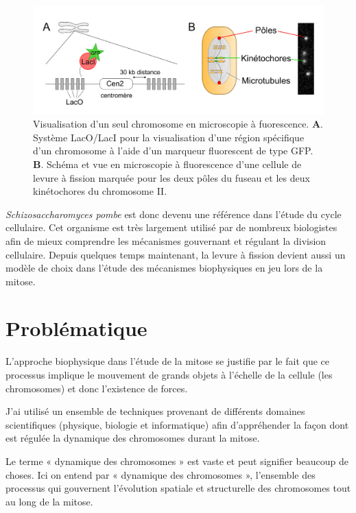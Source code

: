 \documentclass[12pt,a4paper,twoside,openright]{book}
\begin{document}
\begin{figure}[htbp]
\centering
\includegraphics{figures/intro/lac.png}
\caption[Visualisation d'un seul chromosome en microscopie à fuorescence]{\label{fig:lac}Visualisation
d'un seul chromosome en microscopie à fuorescence. \textbf{A}. Système
LacO/LacI pour la visualisation d'une région spécifique d'un chromosome
à l'aide d'un marqueur fluorescent de type GFP. \textbf{B}. Schéma et
vue en microscopie à fluorescence d'une cellule de levure à fission
marquée pour les deux pôles du fuseau et les deux kinétochores du
chromosome II.}
\end{figure}

\emph{Schizosaccharomyces pombe} est donc devenu une référence dans
l'étude du cycle cellulaire. Cet organisme est très largement utilisé
par de nombreux biologistes afin de mieux comprendre les mécanismes
gouvernant et régulant la division cellulaire. Depuis quelques temps
maintenant, la levure à fission devient aussi un modèle de choix dans
l'étude des mécanismes biophysiques en jeu lors de la mitose.

\section{Problématique}\label{probluxe9matique}

L'approche biophysique dans l'étude de la mitose se justifie par le fait
que ce processus implique le mouvement de grands objets à l'échelle de
la cellule (les chromosomes) et donc l'existence de forces.

J'ai utilisé un ensemble de techniques provenant de différents domaines
scientifiques (physique, biologie et informatique) afin d'appréhender la
façon dont est régulée la dynamique des chromosomes durant la mitose.

Le terme « dynamique des chromosomes » est vaste et peut signifier
beaucoup de choses. Ici on entend par « dynamique des chromosomes »,
l'ensemble des processus qui gouvernent l'évolution spatiale et
structurelle des chromosomes tout au long de la mitose.
\end{document}
